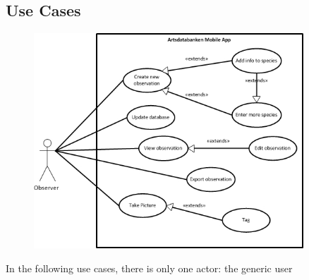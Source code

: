 \subsection{Use Cases}
\label{sec:usecases}

\begin{figure}[htb]
	\centering
	\includegraphics[width=0.9\textwidth]{reqspec/mainusecase.jpg}
	\label{fig:usecase}
\end{figure}

In the following use cases, there is only one actor: the generic user



